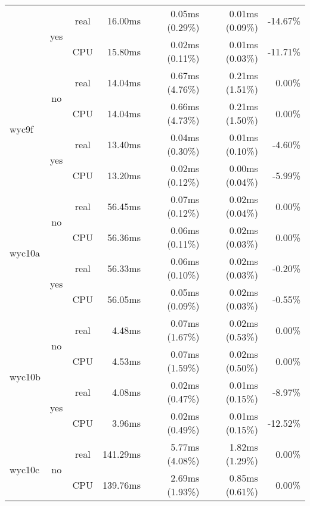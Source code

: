 \documentclass[en]{pracamgr}
\begin{document}
\begin{appendices}
\begin{small}
\begin{longtable}{|l|c|c|r|r|r|r|}
                          \cline{2-7}
                          & \multirow{2}{*}{yes} & real & 16.00ms & 0.05ms (0.29\%) & 0.01ms (0.09\%) & -14.67\% \\*
                          &                      & CPU  & 15.80ms & 0.02ms (0.11\%) & 0.01ms (0.03\%) & -11.71\% \\
\hline
\multirow{4}{*}{wyc9f}    & \multirow{2}{*}{no}  & real & 14.04ms & 0.67ms (4.76\%) & 0.21ms (1.51\%) & 0.00\% \\*
                          &                      & CPU  & 14.04ms & 0.66ms (4.73\%) & 0.21ms (1.50\%) & 0.00\% \\*
                          \cline{2-7}
                          & \multirow{2}{*}{yes} & real & 13.40ms & 0.04ms (0.30\%) & 0.01ms (0.10\%) & -4.60\% \\*
                          &                      & CPU  & 13.20ms & 0.02ms (0.12\%) & 0.00ms (0.04\%) & -5.99\% \\
\hline
\multirow{4}{*}{wyc10a}   & \multirow{2}{*}{no}  & real & 56.45ms & 0.07ms (0.12\%) & 0.02ms (0.04\%) & 0.00\% \\*
                          &                      & CPU  & 56.36ms & 0.06ms (0.11\%) & 0.02ms (0.03\%) & 0.00\% \\*
                          \cline{2-7}
                          & \multirow{2}{*}{yes} & real & 56.33ms & 0.06ms (0.10\%) & 0.02ms (0.03\%) & -0.20\% \\*
                          &                      & CPU  & 56.05ms & 0.05ms (0.09\%) & 0.02ms (0.03\%) & -0.55\% \\
\hline
\multirow{4}{*}{wyc10b}   & \multirow{2}{*}{no}  & real & 4.48ms & 0.07ms (1.67\%) & 0.02ms (0.53\%) & 0.00\% \\*
                          &                      & CPU  & 4.53ms & 0.07ms (1.59\%) & 0.02ms (0.50\%) & 0.00\% \\*
                          \cline{2-7}
                          & \multirow{2}{*}{yes} & real & 4.08ms & 0.02ms (0.47\%) & 0.01ms (0.15\%) & -8.97\% \\*
                          &                      & CPU  & 3.96ms & 0.02ms (0.49\%) & 0.01ms (0.15\%) & -12.52\% \\
\hline
\multirow{4}{*}{wyc10c}   & \multirow{2}{*}{no}  & real & 141.29ms & 5.77ms (4.08\%) & 1.82ms (1.29\%) & 0.00\% \\*
                          &                      & CPU  & 139.76ms & 2.69ms (1.93\%) & 0.85ms (0.61\%) & 0.00\% \\*

\end{longtable}
\end{small}
\end{appendices}
\end{document}

